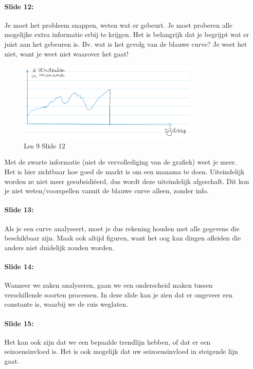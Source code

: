 \documentclass[10pt,a4paper]{report}
\begin{document}
\paragraph{Slide 12:} Je moet het probleem snappen, weten wat er gebeurt. Je moet proberen alle mogelijke extra informatie erbij te krijgen. Het is belangrijk dat je begrijpt wat er juist aan het gebeuren is. Bv. wat is het gevolg van de blauwe curve? Je weet het niet, want je weet niet waarover het gaat!

\begin{figure}[h!]
\centering
\includegraphics[width=90mm]{Les09_06.png}
\caption{Les 9 Slide 12} 
\label{les09_06}
\end{figure}

Met de zwarte informatie (niet de vervollediging van de grafiek) weet je meer. Het is hier zichtbaar hoe goed de markt is om een manama te doen. Uiteindelijk worden ze niet meer gesubsidi\"eerd, dus wordt deze uiteindelijk afgeschaft. Dit kon je niet weten/voorspellen vanuit de blauwe curve alleen, zonder info.

\paragraph{Slide 13:} Als je een curve analyseert, moet je dus rekening houden met alle gegevens die beschikbaar zijn. Maak ook altijd figuren, want het oog kan dingen afleiden die anders niet duidelijk zouden worden.

\paragraph{Slide 14:} Wanneer we zaken analyseren, gaan we een onderscheid maken tussen verschillende soorten processen. In deze slide kan je zien dat er ongeveer een constante is, waarbij we de ruis weglaten. 

\paragraph{Slide 15:} Het kan ook zijn dat we een bepaalde trendlijn hebben, of dat er een seizoensinvloed is. Het is ook mogelijk dat uw seizoensinvloed in steigende lijn gaat. 
\end{document}
